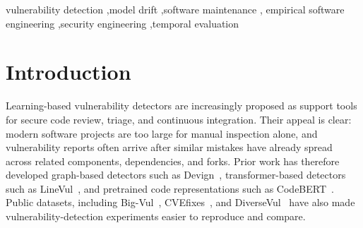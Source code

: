 \documentclass[a4paper,fleqn]{cas-dc}
\begin{document}
\begin{keywords}
vulnerability detection \sep model drift \sep software maintenance \sep
empirical software engineering \sep security engineering \sep temporal
evaluation
\end{keywords}

\maketitle


\section{Introduction}

Learning-based vulnerability detectors are increasingly proposed as support
tools for secure code review, triage, and continuous integration. Their appeal
is clear: modern software projects are too large for manual inspection alone,
and vulnerability reports often arrive after similar mistakes have already
spread across related components, dependencies, and forks. Prior work has
therefore developed graph-based detectors such as Devign~\cite{zhou2019devign},
transformer-based detectors such as LineVul~\cite{fu2022linevul}, and
pretrained code representations such as CodeBERT~\cite{feng2020codebert}.
Public datasets, including Big-Vul~\cite{fan2020bigvul},
CVEfixes~\cite{bhandari2021cvefixes}, and
DiverseVul~\cite{chen2023diversevul} have also made vulnerability-detection
experiments easier to reproduce and compare.
\end{document}
